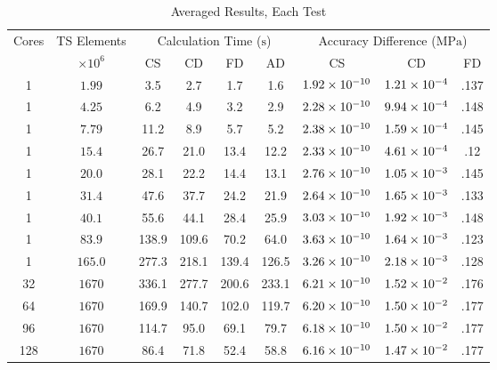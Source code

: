 \documentclass[preprint,12pt]{elsarticle}
\providecommand{\DIFaddtex}[1]{{\protect\color{blue}\uwave{#1}}} %
\providecommand{\DIFaddbegin}{} %
\providecommand{\DIFdelend}{} %
\providecommand{\DIFaddFL}[1]{\DIFadd{#1}} %
\providecommand{\DIFaddbeginFL}{} %
\providecommand{\DIFaddendFL}{} %
\providecommand{\DIFadd}[1]{\texorpdfstring{\DIFaddtex{#1}}{#1}} %
\begin{document}
\DIFdelend \DIFaddbegin \begin{table}[!tbp]    
  \scriptsize
  \DIFaddendFL \centering
  \caption{Averaged Results, Each Test\DIFaddbeginFL \DIFaddFL{.}\DIFaddendFL } \label{tab:results}   
       \begin{tabular}{c c c c c c c c c}
         \toprule
         Cores & TS Elements & \multicolumn{4}{c}{Calculation Time ($\si{\second}$)} & \multicolumn{3}{c}{Accuracy Difference ($\si{\mega\pascal}$)} \\ 
         & $\times 10^6$ & CS & CD & FD & AD & CS & CD & FD \\
        \midrule
        1 & $\num{1.99}$  & 3.5 & 2.7 & 1.7 & 1.6 & $\num{1.92E-10}$ & $\num{1.21E-4}$ & .137 \\
        1 & $\num{4.25}$  & 6.2& 4.9& 3.2& 2.9 & $\num{2.28E-10}$ & $\num{9.94E-4}$ & .148 \\
        1 & $\num{7.79}$  & 11.2& 8.9& 5.7& 5.2 & $\num{2.38E-10}$ & $\num{1.59E-4}$ & .145\\
        1 & $\num{15.4}$  & 26.7& 21.0& 13.4& 12.2 & $\num{2.33E-10}$ & $\num{4.61E-4}$ & .12 \\
        1 & $\num{20.0}$  & 28.1& 22.2& 14.4& 13.1 & $\num{2.76E-10}$ & $\num{1.05E-3}$ & .145 \\
        1 & $\num{31.4}$  & 47.6& 37.7& 24.2& 21.9 & $\num{2.64E-10}$ & $\num{1.65E-3}$ & .133 \\
        1 & $\num{40.1}$  & 55.6& 44.1& 28.4& 25.9 & $\num{3.03E-10}$ & $\num{1.92E-3}$ & .148 \\
        1 & $\num{83.9}$  & 138.9& 109.6& 70.2& 64.0 & $\num{3.63E-10}$ & $\num{1.64E-3}$ & .123 \\
        1 & $\num{165.0}$  & 277.3& 218.1& 139.4& 126.5 & $\num{3.26E-10}$ & $\num{2.18E-3}$ & .128 \\
        32 & $\num{1670}$  & 336.1& 277.7& 200.6& 233.1 & $\num{6.21E-10}$ & $\num{1.52E-2}$ & .176 \\
        64 & $\num{1670}$  & 169.9& 140.7& 102.0& 119.7 & $\num{6.20E-10}$ & $\num{1.50E-2}$ & .177 \\
        96 & $\num{1670}$  & 114.7& 95.0& 69.1 & 79.7 & $\num{6.18E-10}$ & $\num{1.50E-2}$ & .177 \\
        128 & $\num{1670}$  & 86.4& 71.8& 52.4 &58.8 & $\num{6.16E-10}$ & $\num{1.47E-2}$ & .177 \\
        \bottomrule
    \end{tabular}
\end{table}
\end{document}
